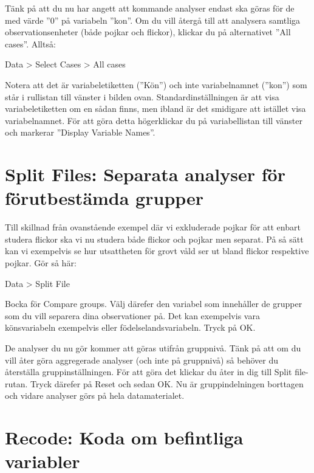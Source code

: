 \documentclass[
]{book}
\begin{document}
Tänk på att du nu har angett att kommande analyser endast ska göras för de med värde ''0'' på
variabeln ''kon''. Om du vill återgå till att analysera samtliga observationsenheter (både pojkar och
flickor), klickar du på alternativet ''All cases''. Alltså:

Data \textgreater{} Select Cases \textgreater{} All cases

Notera att det är variabeletiketten (''Kön'') och inte variabelnamnet (''kon'') som står i rullistan till
vänster i bilden ovan. Standardinställningen är att visa variabeletiketten om en sådan finns, men
ibland är det smidigare att istället visa variabelnamnet. För att göra detta högerklickar du på
variabellistan till vänster och markerar ''Display Variable Names''.

\hypertarget{split-files-separata-analyser-fuxf6r-fuxf6rutbestuxe4mda-grupper}{%
\section{Split Files: Separata analyser för förutbestämda grupper}\label{split-files-separata-analyser-fuxf6r-fuxf6rutbestuxe4mda-grupper}}

Till skillnad från ovanstående exempel där vi exkluderade pojkar för att enbart studera flickor ska vi nu studera både flickor och pojkar men separat. På så sätt kan vi exempelvis se hur utsattheten för grovt våld ser ut bland flickor respektive pojkar. Gör så här:

Data \textgreater{} Split File

Bocka för Compare groups. Välj därefer den variabel som innehåller de grupper som du vill separera dina observationer på. Det kan exempelvis vara könsvariabeln exempelvis eller födelselandsvariabeln. Tryck på OK.

De analyser du nu gör kommer att göras utifrån gruppnivå. Tänk på att om du vill åter göra aggregerade analyser (och inte på gruppnivå) så behöver du återställa gruppinställningen. För att göra det klickar du åter in dig till Split file-rutan. Tryck därefer på Reset och sedan OK. Nu är gruppindelningen borttagen och vidare analyser görs på hela datamaterialet.

\hypertarget{recode-koda-om-befintliga-variabler}{%
\section{Recode: Koda om befintliga variabler}\label{recode-koda-om-befintliga-variabler}}
\end{document}
